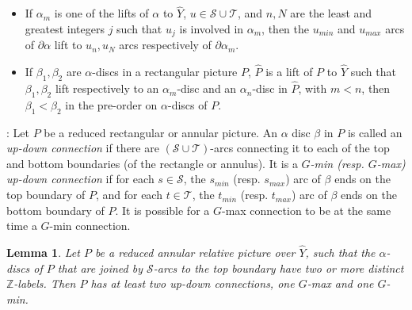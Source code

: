 \documentclass[12pt,a4paper]{amsart}
\def\Z{\mathbb{Z}}
\def\wh{\widehat}
\def\a{\alpha}
\def\b{\beta}
\def\cS{\mathcal{S}}
\def\cT{\mathcal{T}}
\newtheorem{lem}[thm]{Lemma}
\begin{document}
 \begin{itemize}
 	\item If $\a_m$ is one of the lifts of $\a$ to $\wh Y$, $u\in\cS\cup\cT$, and $n,N$ are the least and greatest integers $j$  such that $u_j$ is involved in $\a_m$, then the $u_{min}$ and $u_{max}$ arcs 
 	of $\partial\a$ lift to $u_n,u_N$ arcs respectively of $\partial\a_m$.
 	\item  If $\b_1,\b_2$ are $\a$-discs in a rectangular picture $P$, 
 	$\wh P$ is a lift of $P$ to $\wh Y$ such that $\b_1,\b_2$ lift respectively to an $\a_m$-disc and an $\a_n$-disc in $\wh P$, 
 	with $m<n$, then $\b_1<\b_2$ in the pre-order on $\a$-discs of $P$.
 \end{itemize}
 
 
 
 
 \medskip{}:  Let $P$ be a reduced rectangular or annular picture.  
 An $\a$ disc  $\beta$ in $P$ is called an {\em up-down connection} 
 if there are $(\cS\cup\cT)$-arcs connecting it to each of the top and bottom boundaries (of the rectangle or annulus).  
 It is a {\em  $G$-min  (resp.  $G$-max) up-down connection} 
 if for each $s \in \cS$, the  $s_{min}$  (resp. $s_{max}$) arc of $\b$ ends on the top boundary of $P$,
 and for each $t \in \cT$, the  $t_{min}$ (resp.   $t_{max}$)  arc of $\b$ ends on the bottom boundary of $P$.
  It is possible for a $G$-max connection to be at the same time  a $G$-min connection.
 
 
 \begin{lem}	\label{surlepont}
 	Let $P$ be a reduced annular relative picture over $\wh Y$, 
 	such that the $\a$-discs of $P$ that are joined by $\cS$-arcs 
 	to the top boundary have two or more distinct $\Z$-labels.  
 	Then $P$ has at least two up-down connections, one $G$-max and one   $G$-min.
 \end{lem}
 
\end{document}

